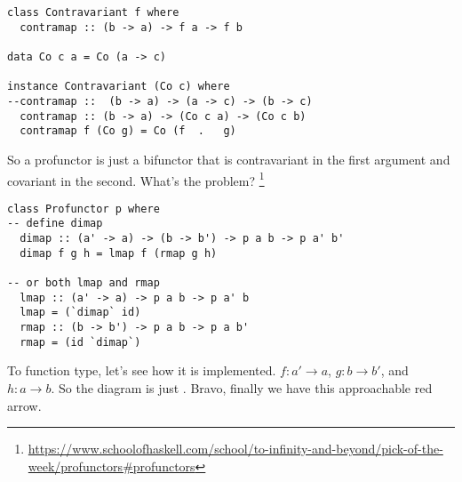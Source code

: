 \begin{lstlisting}
class Contravariant f where
  contramap :: (b -> a) -> f a -> f b

data Co c a = Co (a -> c)

instance Contravariant (Co c) where
--contramap ::  (b -> a) -> (a -> c) -> (b -> c)
  contramap :: (b -> a) -> (Co c a) -> (Co c b)
  contramap f (Co g) = Co (f  .   g)
\end{lstlisting}

So a profunctor is just a bifunctor that is contravariant in the first argument
and covariant in the second. What's the problem?
\footnote{\url{https://www.schoolofhaskell.com/school/to-infinity-and-beyond/pick-of-the-week/profunctors\#profunctors}}

\begin{lstlisting}
class Profunctor p where
-- define dimap
  dimap :: (a' -> a) -> (b -> b') -> p a b -> p a' b'
  dimap f g h = lmap f (rmap g h)

-- or both lmap and rmap
  lmap :: (a' -> a) -> p a b -> p a' b
  lmap = (`dimap` id)
  rmap :: (b -> b') -> p a b -> p a b'
  rmap = (id `dimap`)
\end{lstlisting}

To function type, let's see how it is implemented. $f : a' \to a$, $g : b \to
b'$, and $h : a \to b$. So the diagram is just . Bravo, finally we have this
approachable red arrow.
